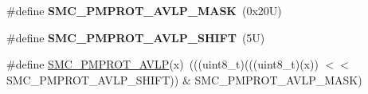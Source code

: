 \begin{DoxyCompactItemize}
\item 
\mbox{\label{group___s_m_c___register___masks_ga30602dafb393b5d9c52f0c75e1d78210}} 
\#define {\bfseries S\+M\+C\+\_\+\+P\+M\+P\+R\+O\+T\+\_\+\+A\+V\+L\+P\+\_\+\+M\+A\+SK}~(0x20\+U)
\item 
\mbox{\label{group___s_m_c___register___masks_gae13777e671c1caf2d10809999574fed4}} 
\#define {\bfseries S\+M\+C\+\_\+\+P\+M\+P\+R\+O\+T\+\_\+\+A\+V\+L\+P\+\_\+\+S\+H\+I\+FT}~(5\+U)
\item 
\#define \mbox{\hyperlink{group___s_m_c___register___masks_ga9cc7998d16f01dc2d8deb5cd1bf184df}{S\+M\+C\+\_\+\+P\+M\+P\+R\+O\+T\+\_\+\+A\+V\+LP}}(x)~(((uint8\+\_\+t)(((uint8\+\_\+t)(x)) $<$$<$ S\+M\+C\+\_\+\+P\+M\+P\+R\+O\+T\+\_\+\+A\+V\+L\+P\+\_\+\+S\+H\+I\+FT)) \& S\+M\+C\+\_\+\+P\+M\+P\+R\+O\+T\+\_\+\+A\+V\+L\+P\+\_\+\+M\+A\+SK)
\end{DoxyCompactItemize}
